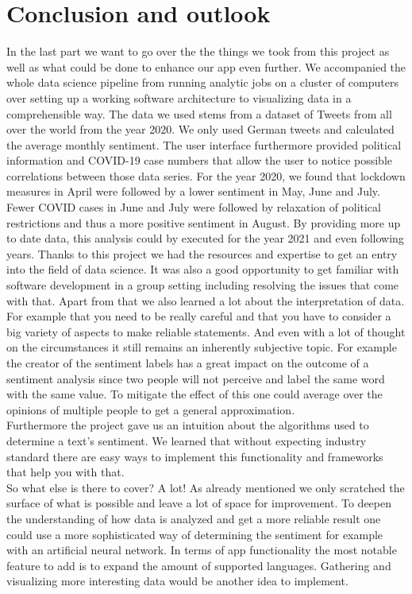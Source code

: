 \documentclass[
    fontsize=12pt,
    headings=small,
    parskip=half,           %
    bibliography=totoc,
    numbers=noenddot,       %
    open=any,               %
    ]{scrreprt}
\begin{document}
\chapter{Conclusion and outlook}
In the last part we want to go over the the things we took from this project as well as what could be done to enhance our app even further. 
We accompanied the whole data science pipeline from running analytic jobs on a cluster of computers over setting up a working software architecture to visualizing data in a comprehensible way. 
The data we used stems from a dataset of Tweets from all over the world from the year 2020. We only used German tweets and calculated the average monthly sentiment. The user interface furthermore provided political information and COVID-19 case numbers that allow the user to notice possible correlations between those data series. For the year 2020, we found that lockdown measures in April were followed by a lower sentiment in May, June and July. Fewer COVID cases in June and July were followed by relaxation of political restrictions and thus a more positive sentiment in August. By providing more up to date data, this analysis could by executed for the year 2021 and even following years. 
\bigbreak
Thanks to this project we had the resources and expertise to get an entry into the field of data science. It was also a good opportunity to get familiar with software development in a group setting including resolving the issues that come with that. Apart from that we also learned a lot about the interpretation of data. For example that you need to be really careful and that you have to consider a big variety of aspects to make reliable statements. And even with a lot of thought on the circumstances it still remains an inherently subjective topic. For example the creator of the sentiment labels has a great impact on the outcome of a sentiment analysis since two people will not perceive and label the same word with the same value. To mitigate the effect of this one could average over the opinions of multiple people to get a general approximation. \\
Furthermore the project gave us an intuition about the algorithms used to determine a text's sentiment. We learned that without expecting industry standard there are easy ways to implement this functionality and frameworks that help you with that.\\
So what else is there to cover? A lot! As already mentioned we only scratched the surface of what is possible and leave a lot of space for improvement. To deepen the understanding of how data is analyzed and get a more reliable result one could use a more sophisticated way of determining the sentiment for example with an artificial neural network. In terms of app functionality the most notable feature to add is to expand the amount of supported languages. Gathering and visualizing more interesting data would be another idea to implement.
\end{document}
